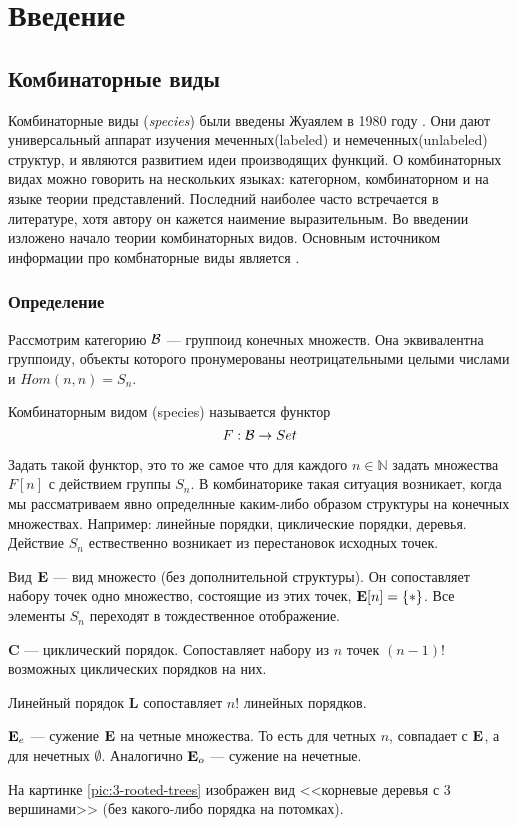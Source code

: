 \section{Введение}

\subsection{Комбинаторные виды}
Комбинаторные виды (\emph{species}) были введены Жуаялем в 1980 году \cite{J1}.
Они дают универсальный аппарат изучения меченных(labeled) и
немеченных(unlabeled) структур, и являются развитием идеи производящих
функций. О комбинаторных видах можно говорить на нескольких языках: категорном,
комбинаторном и на языке теории представлений. Последний наиболее часто
встречается в литературе, хотя автору он кажется наимение выразительным.
Во введении изложено начало теории комбинаторных видов. Основным источником
информации про комбнаторные виды является \cite{BergTrees}.
\subsubsection{Определение}
Рассмотрим категорию $\mathcal B$ --- группоид конечных множеств. Она эквивалентна
группоиду, объекты которого пронумерованы неотрицательными целыми числами и
$Hom(n, n) = S_n$.
\begin{definition}
Комбинаторным видом (species) называется функтор $$F:\mathcal B \rightarrow Set$$
\end{definition}

Задать такой функтор, это то же самое что для каждого $n \in
\mathbb N$ задать множества $F[n]$ с действием группы $S_n$. В комбинаторике
такая ситуация возникает, когда мы рассматриваем явно определнные каким-либо
образом структуры на конечных множествах. Например: линейные порядки,
циклические порядки, деревья. Действие $S_n$ ествественно возникает из
перестановок исходных точек.
\begin{example}
Вид $\mathbf E$ --- вид множесто (без дополнительной структуры). Он
сопоставляет набору точек одно множество, состоящие из этих точек, 
$\mathbf E[n] =\{*\}$.
Все элементы $S_n$ переходят в тождественное отображение. 
\end{example}
\begin{example}
$\mathbf C$ --- циклический порядок. Сопоставляет набору из $n$ точек
$(n-1)!$ возможных циклических порядков на них. 
\end{example}
\begin{example}
Линейный порядок $\mathbf L$ сопоставляет $n!$ линейных
порядков. 
\end{example}
\begin{example}
$\mathbf E_e$ --- сужение $\mathbf E$ на четные множества. То есть для четных
$n$, совпадает с $\mathbf E$, а для нечетных $\emptyset$. 
Аналогично $\mathbf E_o$ --- сужение на нечетные.
\end{example}
\begin{example}
На картинке \ref{pic:3-rooted-trees} изображен вид <<корневые
деревья с 3 вершинами>> (без какого-либо порядка на потомках).
\end{example}


